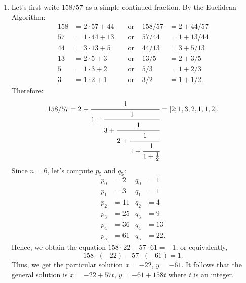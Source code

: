 \begin{solution}
\begin{enumerate}
        Hence, we obtain the equation $18\cdot 2 - 5 \cdot 7 = 1$, or equivalently,
        $$18\cdot 48 + 5 \cdot (-168) = 24.$$
        Thus, we get the particular solution $x = 48$, $y = -168$. It follows that the general solution is $x = 48 + 5t$, $y = -168 - 18t$ where $t$ is an integer.
        \item Let's first write $158/57$ as a simple continued fraction. By the Euclidean Algorithm:
        \begin{align*}
            158 &= 2\cdot 57 + 44 & &\text{ or } & 158/57 &= 2 + 44/57 \\
            57 &= 1\cdot 44 + 13 & &\text{ or } & 57/44 &= 1 + 13/44 \\
            44 &= 3\cdot 13 + 5 & &\text{ or } & 44/13 &= 3 + 5/13 \\
            13 &= 2\cdot 5 + 3 & &\text{ or } & 13/5 &= 2 + 3/5 \\
            5 &= 1\cdot 3 + 2 & &\text{ or } & 5/3 &= 1 + 2/3 \\
            3 &= 1\cdot 2 + 1 & &\text{ or } & 3/2 &= 1 + 1/2.
        \end{align*}
        Therefore:
        $$158/57 = 2 + \cfrac{1}{
                1 + \cfrac{1}{
                    3 + \cfrac{1}{
                        2 + \cfrac{1}{
                            1 + \cfrac{1}{
                                1 + \frac{1}{2}
                            }
                        }
                    }
                }
            }
        = [2; 1, 3, 2, 1, 1, 2].$$
        Since $n = 6$, let's compute $p_5$ and $q_5$:
        \begin{align*}
            p_0 &= 2 & q_0 &= 1 \\
            p_1 &= 3 & q_1 &= 1 \\
            p_2 &= 11 & q_2 &= 4 \\
            p_3 &= 25 & q_3 &= 9 \\
            p_4 &= 36 & q_4 &= 13 \\
            p_5 &= 61 & q_5 &= 22.
        \end{align*}
        Hence, we obtain the equation $158\cdot 22 - 57 \cdot 61 = -1$, or equivalently,
        $$158\cdot (-22) - 57 \cdot (-61) = 1.$$
        Thus, we get the particular solution $x = -22$, $y = -61$. It follows that the general solution is $x = -22 + 57t$, $y = -61 + 158t$ where $t$ is an integer. \\
    \end{enumerate}
\end{solution}

